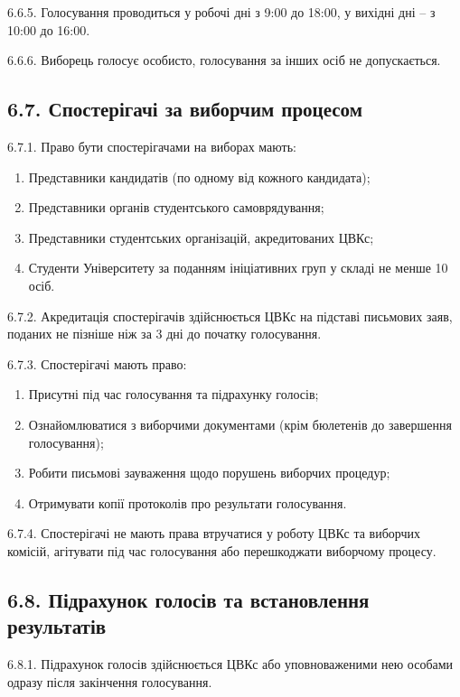     6.6.5. Голосування проводиться у робочі дні з 9:00 до 18:00, у вихідні дні -- з 10:00 до 16:00.

    6.6.6. Виборець голосує особисто, голосування за інших осіб не допускається.

\subsection*{6.7. Спостерігачі за виборчим процесом}
    6.7.1. Право бути спостерігачами на виборах мають:

        \begin{enumerate}[label=\alph*)]
            \item Представники кандидатів (по одному від кожного кандидата);
            \item Представники органів студентського самоврядування;
            \item Представники студентських організацій, акредитованих ЦВКс;
            \item Студенти Університету за поданням ініціативних груп у складі не менше 10 осіб.
        \end{enumerate}

    6.7.2. Акредитація спостерігачів здійснюється ЦВКс на підставі письмових заяв, поданих не пізніше ніж за 3 дні до початку голосування.

    6.7.3. Спостерігачі мають право:

        \begin{enumerate}[label=\alph*)]
            \item Присутні під час голосування та підрахунку голосів;
            \item Ознайомлюватися з виборчими документами (крім бюлетенів до завершення голосування);
            \item Робити письмові зауваження щодо порушень виборчих процедур;
            \item Отримувати копії протоколів про результати голосування.
        \end{enumerate}

    6.7.4. Спостерігачі не мають права втручатися у роботу ЦВКс та виборчих комісій, агітувати під час голосування або перешкоджати виборчому процесу.

\subsection*{6.8. Підрахунок голосів та встановлення результатів}
    6.8.1. Підрахунок голосів здійснюється ЦВКс або уповноваженими нею особами одразу після закінчення голосування.

